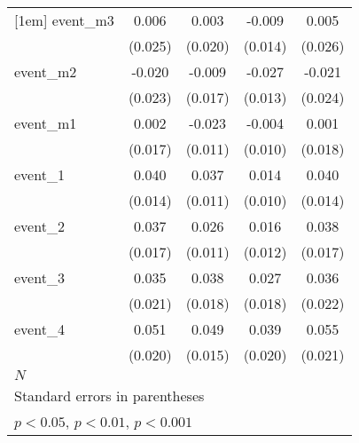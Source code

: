 \begin{table}[htbp]
\begin{tabular}{l*{4}{c}}
[1em]
event\_m3    &       0.006         &       0.003         &      -0.009         &       0.005         \\
            &     (0.025)         &     (0.020)         &     (0.014)         &     (0.026)         \\
[1em]
event\_m2    &      -0.020         &      -0.009         &      -0.027\sym{*}  &      -0.021         \\
            &     (0.023)         &     (0.017)         &     (0.013)         &     (0.024)         \\
[1em]
event\_m1    &       0.002         &      -0.023\sym{*}  &      -0.004         &       0.001         \\
            &     (0.017)         &     (0.011)         &     (0.010)         &     (0.018)         \\
[1em]
event\_1     &       0.040\sym{**} &       0.037\sym{***}&       0.014         &       0.040\sym{**} \\
            &     (0.014)         &     (0.011)         &     (0.010)         &     (0.014)         \\
[1em]
event\_2     &       0.037\sym{*}  &       0.026\sym{*}  &       0.016         &       0.038\sym{*}  \\
            &     (0.017)         &     (0.011)         &     (0.012)         &     (0.017)         \\
[1em]
event\_3     &       0.035         &       0.038\sym{*}  &       0.027         &       0.036         \\
            &     (0.021)         &     (0.018)         &     (0.018)         &     (0.022)         \\
[1em]
event\_4     &       0.051\sym{*}  &       0.049\sym{***}&       0.039         &       0.055\sym{**} \\
            &     (0.020)         &     (0.015)         &     (0.020)         &     (0.021)         \\
\hline
\(N\)       &                     &                     &                     &                     \\
\hline\hline
\multicolumn{5}{l}{\footnotesize Standard errors in parentheses}\\
\multicolumn{5}{l}{\footnotesize \sym{*} \(p<0.05\), \sym{**} \(p<0.01\), \sym{***} \(p<0.001\)}\\
\end{tabular}
\end{table}
